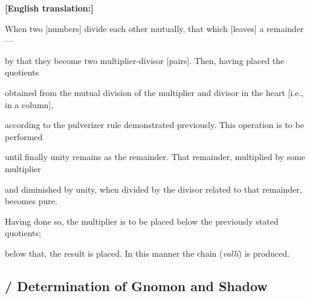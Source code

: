 \documentclass[10pt,a4paper]{article}
\begin{document}
\begin{minipage}[t]{0.47\textwidth}


\end{minipage}%

\hfill\vline\hfill%

\begin{minipage}[t]{0.47\textwidth}

\textbf{[English translation:]}

When two [numbers] divide each other mutually, that which [leaves] a remainder ---

by that they become two multiplier-divisor [pairs]. Then, having placed the quotients

obtained from the mutual division of the multiplier and divisor in the heart [i.e., in a column],

according to the pulverizer rule demonstrated previously. This operation is to be performed

until finally unity remains as the remainder. That remainder, multiplied by some multiplier

and diminished by unity, when divided by the divisor related to that remainder, becomes pure.

Having done so, the multiplier is to be placed below the previously stated quotients;

below that, the result is placed. In this manner the chain (\textit{vallī}) is produced.

\end{minipage}



\vspace{1.5em}



\subsection*{ / Determination of Gnomon and Shadow}
\end{document}
